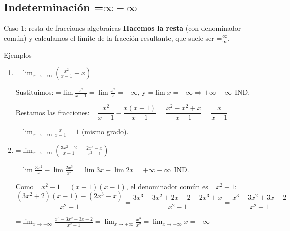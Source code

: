 \documentclass[11pt,a4paper]{article}
\newcommand{\fmm}[1]{\setbox0=\hbox{$#1$}\ifdim\wd0>\linewidth\[#1\]\else\mbox{\box0}\fi}
\begin{document}
  
\subsection*{Indeterminación \fmm{\infty-\infty}}

  
\begin{fmdef}{Caso 1: resta de fracciones algebraicas}
\textbf{Hacemos la resta} (con denominador común) y calculamos el límite de la fracción resultante, que suele ser \fmm{\frac{\infty}{\infty}}.
\end{fmdef}

  
\begin{fmex}{Ejemplos}
\begin{enumerate}[label=\textbf{\arabic*.},leftmargin=*]
\item \fmm{\displaystyle\lim_{x\to+\infty}\left(\frac{x^2}{x-1}-x\right)}
          

            

Sustituimos: \fmm{\displaystyle\lim\frac{x^2}{x-1}=\lim\frac{x^2}{x}=+\infty}, y \fmm{\lim x=+\infty\Rightarrow+\infty-\infty\ \ \text{IND.}}

            

Restamos las fracciones: \fmm{\dfrac{x^2}{x-1}-\dfrac{x(x-1)}{x-1}=\dfrac{x^2-x^2+x}{x-1}=\dfrac{x}{x-1}}

            

\fmm{\displaystyle\lim_{x\to+\infty}\frac{x}{x-1}=1} (mismo grado).
\item \fmm{\displaystyle\lim_{x\to+\infty}\left(\frac{3x^2+2}{x+1}-\frac{2x^3-x}{x^2-1}\right)}
          

            

\fmm{\displaystyle\lim\frac{3x^2}{x}-\lim\frac{2x^3}{x^2}=\lim3x-\lim2x=+\infty-\infty\ \ \text{IND.}}

            

Como \fmm{x^2-1=(x+1)(x-1)}, el denominador común es \fmm{x^2-1}: 
\[\frac{(3x^2+2)(x-1)-(2x^3-x)}{x^2-1}=\frac{3x^3-3x^2+2x-2-2x^3+x}{x^2-1}=\frac{x^3-3x^2+3x-2}{x^2-1}\]

            

\fmm{\displaystyle\lim_{x\to+\infty}\frac{x^3-3x^2+3x-2}{x^2-1}=\lim_{x\to+\infty}\frac{x^3}{x^2}=\lim_{x\to+\infty}x=+\infty}
\end{enumerate}
\end{fmex}
\end{document}
